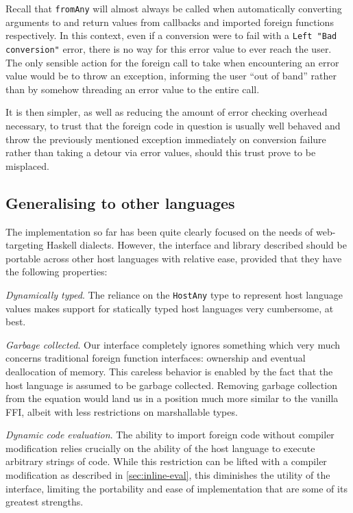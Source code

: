 \documentclass[preprint]{sigplanconf}
\begin{document}
Recall that \lstinline!fromAny! will almost always be called when
automatically converting arguments to and return values from callbacks and
imported foreign functions respectively. In this context, even if a conversion
were to fail with a \lstinline!Left "Bad conversion"! error, there is no way
for this error value to ever reach the user. The only sensible action for the
foreign call to take when encountering an error value would be to throw an
exception, informing the user ``out of band'' rather than by somehow threading
an error value to the entire call.

It is then simpler, as well as reducing the amount of error checking overhead
necessary, to trust that the foreign code in question is usually well behaved
and throw the previously mentioned exception immediately on conversion failure
rather than taking a detour via error values,
should this trust prove to be misplaced.

\subsection{Generalising to other languages}
\label{sec:generalising}
The implementation so far has been quite clearly focused on the needs of
web-targeting Haskell dialects. However, the interface and library described
should be portable across other host languages with relative ease, provided
that they have the following properties:

\emph{Dynamically typed}. The reliance on the
\lstinline!HostAny! type to represent host language values makes support for
statically typed host languages very cumbersome, at best.

\emph{Garbage collected}. Our interface completely ignores something which
very much concerns traditional foreign function interfaces: ownership and
eventual deallocation of memory. This careless behavior is enabled by the
fact that the host language is assumed to be garbage collected. Removing
garbage collection from the equation would land us in a position much
more similar to the vanilla FFI, albeit with less restrictions on
marshallable types.

\emph{Dynamic code evaluation}. The ability to import foreign code without
compiler modification relies crucially on the ability of the host language
to execute arbitrary strings of code. While this restriction can be lifted
with a compiler modification as described in \ref{sec:inline-eval}, this
diminishes the utility of the interface, limiting the portability and
ease of implementation that are some of its greatest strengths.
\end{document}
